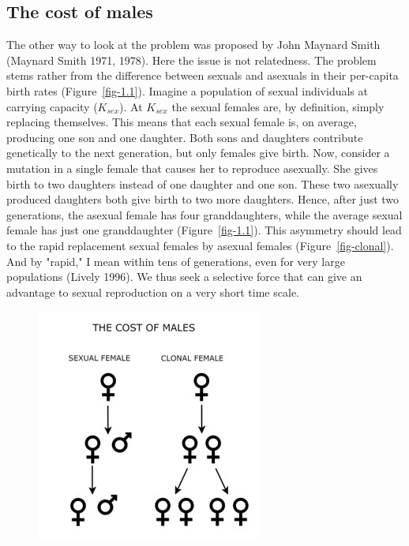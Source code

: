 \documentclass[
  letterpaper,
]{book}
\begin{document}
\hypertarget{the-cost-of-males}{%
\subsection{The cost of males}\label{the-cost-of-males}}

The other way to look at the problem was proposed by John Maynard Smith
(Maynard Smith 1971, 1978). Here the issue is not relatedness. The
problem stems rather from the difference between sexuals and asexuals in
their per-capita birth rates (Figure~\ref{fig-1.1}). Imagine a
population of sexual individuals at carrying capacity (\(K_{sex}\)). At
\(K_{sex}\) the sexual females are, by definition, simply replacing
themselves. This means that each sexual female is, on average, producing
one son and one daughter. Both sons and daughters contribute genetically
to the next generation, but only females give birth. Now, consider a
mutation in a single female that causes her to reproduce asexually. She
gives birth to two daughters instead of one daughter and one son. These
two asexually produced daughters both give birth to two more daughters.
Hence, after just two generations, the asexual female has four
granddaughters, while the average sexual female has just one
granddaughter (Figure~\ref{fig-1.1}). This asymmetry should lead to the
rapid replacement sexual females by asexual females
(Figure~\ref{fig-clonal}). And by "rapid," I mean within tens of
generations, even for very large populations (Lively 1996). We thus seek
a selective force that can give an advantage to sexual reproduction on a
very short time scale.

\begin{figure}


{\centering \includegraphics{images/fig1-1.jpg}

}

\end{figure}
\end{document}
